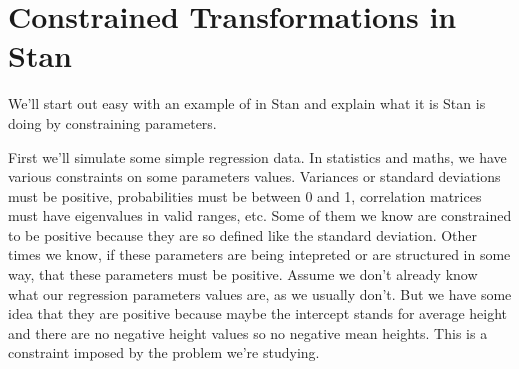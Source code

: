 \documentclass[
  letterpaper,
  DIV=11,
  numbers=noendperiod]{scrartcl}
\begin{document}
\section{Constrained Transformations in
Stan}\label{constrained-transformations-in-stan}

We'll start out easy with an example of in Stan and explain what it is
Stan is doing by constraining parameters.

First we'll simulate some simple regression data. In statistics and
maths, we have various constraints on some parameters values. Variances
or standard deviations must be positive, probabilities must be between 0
and 1, correlation matrices must have eigenvalues in valid ranges, etc.
Some of them we know are constrained to be positive because they are so
defined like the standard deviation. Other times we know, if these
parameters are being intepreted or are structured in some way, that
these parameters must be positive. Assume we don't already know what our
regression parameters values are, as we usually don't. But we have some
idea that they are positive because maybe the intercept stands for
average height and there are no negative height values so no negative
mean heights. This is a constraint imposed by the problem we're
studying.
\end{document}
